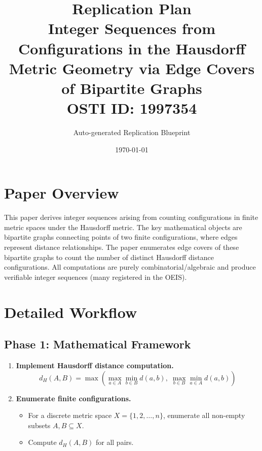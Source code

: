 \documentclass[11pt,a4paper]{article}
\title{\textbf{Replication Plan}\\[0.5em]
\large Integer Sequences from Configurations in the Hausdorff Metric Geometry via Edge Covers of Bipartite Graphs\\[0.3em]
\normalsize OSTI ID: 1997354}
\author{Auto-generated Replication Blueprint}
\date{\today}
\begin{document}
\maketitle
\tableofcontents
\newpage

\section{Paper Overview}
This paper derives integer sequences arising from counting configurations in finite metric spaces under the Hausdorff metric. The key mathematical objects are bipartite graphs connecting points of two finite configurations, where edges represent distance relationships. The paper enumerates edge covers of these bipartite graphs to count the number of distinct Hausdorff distance configurations. All computations are purely combinatorial/algebraic and produce verifiable integer sequences (many registered in the OEIS).

\section{Detailed Workflow}

\subsection{Phase 1: Mathematical Framework}
\begin{enumerate}[label=\textbf{1.\arabic*}]
  \item \textbf{Implement Hausdorff distance computation.}
    \begin{equation*}
      d_H(A, B) = \max\left(\max_{a \in A} \min_{b \in B} d(a,b),\; \max_{b \in B} \min_{a \in A} d(a,b)\right)
    \end{equation*}
  \item \textbf{Enumerate finite configurations.}
    \begin{itemize}
      \item For a discrete metric space $X = \{1, 2, \ldots, n\}$, enumerate all non-empty subsets $A, B \subseteq X$.
      \item Compute $d_H(A, B)$ for all pairs.
    \end{itemize}
\end{enumerate}
\end{document}
